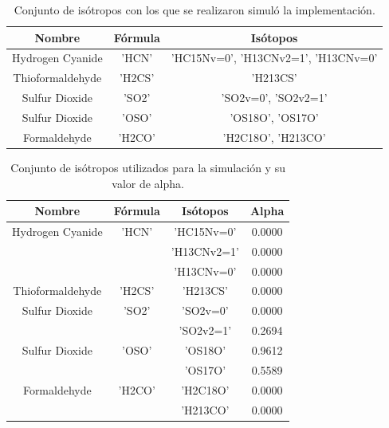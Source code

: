 \begin {table}[H]
\begin{center}
	\begin{tabular}{|c|c|c|}
		\hline Nombre & Fórmula &  Isótopos \\ 
		

		\hline	Hydrogen Cyanide & 'HCN' & 'HC15Nv=0', 'H13CNv2=1', 'H13CNv=0'\\ 
		
		\hline	Thioformaldehyde & 'H2CS' & 'H213CS' \\
		
		\hline	Sulfur Dioxide & 'SO2' & 'SO2v=0', 'SO2v2=1' \\
		
		\hline	Sulfur Dioxide & 'OSO' & 'OS18O', 'OS17O' \\
		
		\hline	Formaldehyde & 'H2CO'  & 'H2C18O', 'H213CO' \\
				
		\hline 
	\end{tabular}
	\caption {Conjunto de isótropos con los que se realizaron simuló la implementación.}
\end{center}
\end{table}

\begin {table}[H]
\begin{center}
	\begin{tabular}{|c|c|c|c|}
		\hline Nombre & Fórmula &  Isótopos & Alpha \\ 
		
		
		\hline	Hydrogen Cyanide & 'HCN'  & 'HC15Nv=0' & 0.0000\\
								 &		  & 'H13CNv2=1' & 0.0000\\
								 &		  & 'H13CNv=0' & 0.0000\\ 
								
		
		\hline	Thioformaldehyde & 'H2CS' & 'H213CS' & 0.0000\\
		
		\hline	Sulfur Dioxide & 'SO2'	  & 'SO2v=0' & 0.0000\\
								&		  & 'SO2v2=1'& 0.2694 \\
		
		\hline	Sulfur Dioxide & 'OSO' & 'OS18O' & 0.9612\\
							   &	   & 'OS17O' & 0.5589\\
		
		\hline	Formaldehyde & 'H2CO'  & 'H2C18O' & 0.0000\\
							 &		   & 'H213CO' & 0.0000\\
		
		\hline 
	\end{tabular}
	\caption {Conjunto de isótropos utilizados para la simulación y su valor de alpha.}
\end{center}
\end{table}

